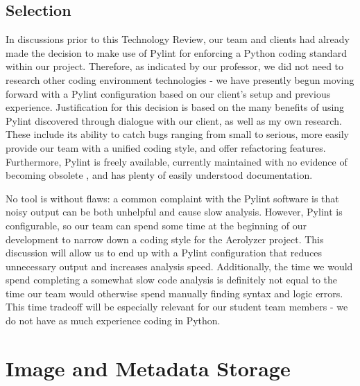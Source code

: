 \documentclass[letterpaper,10pt,draftclsnofoot,onecolumn]{IEEEtran}
\begin{document}
\begin{flushleft}
\subsection{Selection}
In discussions prior to this Technology Review, our team and clients had already made the decision to make use of Pylint for enforcing a Python coding standard within our project. Therefore, as indicated by our professor, we did not need to research other coding environment technologies - we have presently begun moving forward with a Pylint configuration based on our client’s setup and previous experience. Justification for this decision is based on the many benefits of using Pylint discovered through dialogue with our client, as well as my own research. These include its ability to catch bugs ranging from small to serious, more easily provide our team with a unified coding style, and offer refactoring features. Furthermore, Pylint is freely available, currently maintained with no evidence of becoming obsolete \cite{4}, and has plenty of easily understood documentation. \cite{3} 

\medskip

No tool is without flaws: a common complaint with the Pylint software is that noisy output can be both unhelpful and cause slow analysis. \cite{2} However, Pylint is configurable, so our team can spend some time at the beginning of our development to narrow down a coding style for the Aerolyzer project. This discussion will allow us to end up with a Pylint configuration that reduces unnecessary output and increases analysis speed. Additionally, the time we would spend completing a somewhat slow code analysis is definitely not equal to the time our team would otherwise spend manually finding syntax and logic errors. This time tradeoff will be especially relevant for our student team members - we do not have as much experience coding in Python. 


\section{Image and Metadata Storage}

\end{flushleft}
\end{document}

